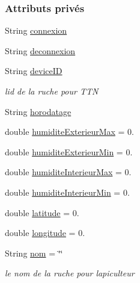 \subsubsection*{Attributs privés}
\begin{DoxyCompactItemize}
\item 
String \hyperlink{classcom_1_1example_1_1bee__honeyt_1_1_ruche_a8b1b18ca9364533f66214ed9daea875e}{connexion}
\item 
String \hyperlink{classcom_1_1example_1_1bee__honeyt_1_1_ruche_a91168fb786c93a5233138f67b6a121ad}{deconnexion}
\item 
String \hyperlink{classcom_1_1example_1_1bee__honeyt_1_1_ruche_a7126c2ff9e0b3b5365e042c5309ad775}{device\+ID}
\begin{DoxyCompactList}\small\item\em l\textquotesingle{}id de la ruche pour T\+TN \end{DoxyCompactList}\item 
String \hyperlink{classcom_1_1example_1_1bee__honeyt_1_1_ruche_a93b3665d844cbba761ebf9a19a1d7d34}{horodatage}
\item 
double \hyperlink{classcom_1_1example_1_1bee__honeyt_1_1_ruche_a76e636b4d5e0a18b187905e0d6d73a71}{humidite\+Exterieur\+Max} = 0.
\item 
double \hyperlink{classcom_1_1example_1_1bee__honeyt_1_1_ruche_ad58b8815412827add256f6c6e11d3043}{humidite\+Exterieur\+Min} = 0.
\item 
double \hyperlink{classcom_1_1example_1_1bee__honeyt_1_1_ruche_a1483266a1f1ba7d83e0f69bef8e26231}{humidite\+Interieur\+Max} = 0.
\item 
double \hyperlink{classcom_1_1example_1_1bee__honeyt_1_1_ruche_ab8234d1bae28a10622b331d3b773445d}{humidite\+Interieur\+Min} = 0.
\item 
double \hyperlink{classcom_1_1example_1_1bee__honeyt_1_1_ruche_a6a75dfabd9812334d502756f91fa4aa9}{latitude} = 0.
\item 
double \hyperlink{classcom_1_1example_1_1bee__honeyt_1_1_ruche_aaeb7392ff8f3f26203e23f1dd57ae89f}{longitude} = 0.
\item 
String \hyperlink{classcom_1_1example_1_1bee__honeyt_1_1_ruche_ac72094a8a08cf8f485be1456863bc4bd}{nom} = \char`\"{}\char`\"{}
\begin{DoxyCompactList}\small\item\em le nom de la ruche pour l\textquotesingle{}apiculteur \end{DoxyCompactList}\item 

\end{DoxyCompactItemize}
